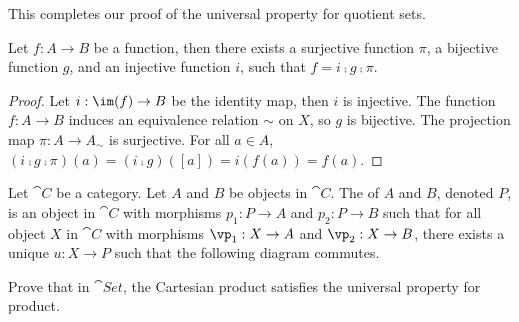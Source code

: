 \documentclass[10pt]{article}
\begin{document}
\par
This completes our proof of the universal property for quotient sets.
\begin{theorem}
    Let $f:A\to B$ be a function, then there exists a surjective function $\pi$, a bijective function $g$, and an injective function $i$, such that $f=i\comp g\comp\pi$.
\end{theorem}
\begin{center}
\end{center}
\begin{proof}
    Let $i:\im(f)\to B$ be the identity map, then $i$ is injective. The function $f:A\to B$ induces an equivalence relation $\sim$ on $X$, so $g$ is bijective. The projection map $\pi:A\to{A}_{\sim}$ is surjective. For all $a\in A$, $(i\comp g\comp\pi)(a)=(i\comp g)([a])=i(f(a))=f(a)$. 
\end{proof}
\begin{definition}
    Let $\cat{C}$ be a category. Let $A$ and $B$ be objects in $\cat{C}$. The  of $A$ and $B$, denoted $P$, is an object in $\cat{C}$ with morphisms ${p}_{1}:P\to A$ and ${p}_{2}:P\to B$ such that for all object $X$ in $\cat{C}$ with morphisms ${\vp}_{1}:X\to A$ and ${\vp}_{2}:X\to B$, there exists a unique $u:X\to P$ such that the following diagram commutes.
\end{definition}
\begin{center}
\end{center}
\begin{problem}
    Prove that in $\cat{Set}$, the Cartesian product satisfies the universal property for product.
\end{problem}
\end{document}
